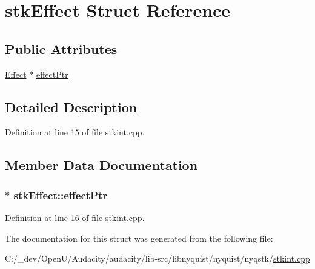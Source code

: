 \hypertarget{structstk_effect}{}\section{stk\+Effect Struct Reference}
\label{structstk_effect}
\subsection*{Public Attributes}
\begin{DoxyCompactItemize}
\item 
\hyperlink{class_nyq_1_1_effect}{Effect} $\ast$ \hyperlink{structstk_effect_a83c32729f1b30086c16fd9a3111d4dc1}{effect\+Ptr}
\end{DoxyCompactItemize}


\subsection{Detailed Description}


Definition at line 15 of file stkint.\+cpp.



\subsection{Member Data Documentation}
\subsubsection[{\texorpdfstring{effect\+Ptr}{effectPtr}}]{$\ast$ stk\+Effect\+::effect\+Ptr}\hypertarget{structstk_effect_a83c32729f1b30086c16fd9a3111d4dc1}{}\label{structstk_effect_a83c32729f1b30086c16fd9a3111d4dc1}


Definition at line 16 of file stkint.\+cpp.



The documentation for this struct was generated from the following file\+:\begin{DoxyCompactItemize}
\item 
C\+:/\+\_\+dev/\+Open\+U/\+Audacity/audacity/lib-\/src/libnyquist/nyquist/nyqstk/\hyperlink{stkint_8cpp}{stkint.\+cpp}\end{DoxyCompactItemize}
